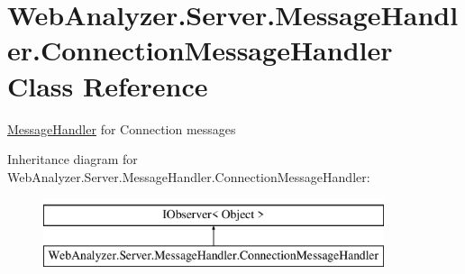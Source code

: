 \hypertarget{class_web_analyzer_1_1_server_1_1_message_handler_1_1_connection_message_handler}{}\section{Web\+Analyzer.\+Server.\+Message\+Handler.\+Connection\+Message\+Handler Class Reference}
\label{class_web_analyzer_1_1_server_1_1_message_handler_1_1_connection_message_handler}


\hyperlink{namespace_web_analyzer_1_1_server_1_1_message_handler}{Message\+Handler} for Connection messages  


Inheritance diagram for Web\+Analyzer.\+Server.\+Message\+Handler.\+Connection\+Message\+Handler\+:\begin{figure}[H]
\begin{center}
\leavevmode
\includegraphics[height=2.000000cm]{class_web_analyzer_1_1_server_1_1_message_handler_1_1_connection_message_handler}
\end{center}
\end{figure}
